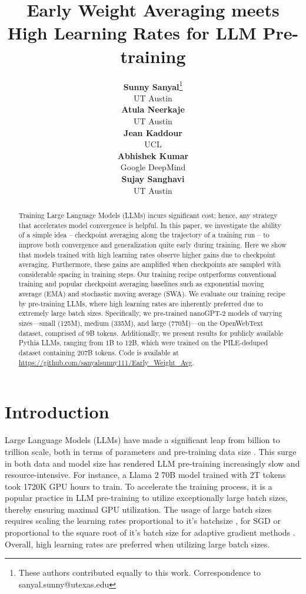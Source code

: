 \documentclass{article}
\title{Early Weight Averaging meets High Learning Rates for LLM Pre-training}
\author{%
  \textbf{Sunny Sanyal}\thanks{These authors contributed equally to this work. Correspondence to sanyal.sunny@utexas.edu} 
  \vspace{0.25em} \\
  UT Austin \\
  \And
  \textbf{Atula Neerkaje}\footnotemark[1]
  \vspace{0.25em} \\
  UT Austin \\
  \And
  \textbf{Jean Kaddour} 
  \vspace{0.25em} \\
  UCL \\
  \AND
  \textbf{Abhishek Kumar} 
  \vspace{0.25em} \\
  Google DeepMind \\
  \And
  \textbf{Sujay Sanghavi} 
  \vspace{0.25em} \\
  UT Austin \\
}
\begin{document}
\maketitle


\begin{abstract}
 Training Large Language Models (LLMs) incurs significant cost; hence, any strategy that accelerates model convergence is helpful. In this paper, we investigate the ability of a simple idea – checkpoint averaging along the trajectory of a training run – to improve both convergence and generalization quite early during training. Here we show that models trained with high learning rates observe higher gains due to checkpoint averaging. Furthermore, these gains are amplified when checkpoints are sampled with considerable spacing in training steps. Our training recipe outperforms conventional training and popular checkpoint averaging baselines such as exponential moving average (EMA) and stochastic moving average (SWA). We evaluate our training recipe by pre-training LLMs, where high learning rates are inherently preferred due to extremely large batch sizes. Specifically, we pre-trained nanoGPT-2 models of varying sizes—small (125M), medium (335M), and large (770M)—on the OpenWebText dataset, comprised of 9B tokens. Additionally, we present results for publicly available Pythia LLMs, ranging from 1B to 12B, which were trained on the PILE-deduped dataset containing 207B tokens. Code is available at \url{https://github.com/sanyalsunny111/Early_Weight_Avg}.
\end{abstract}


\section{Introduction} \label{sec:intro}

Large Language Models (LLMs) have made a significant leap from billion to trillion scale, both in terms of parameters \citep{chowdhery2022palm, ren2023pangu} and pre-training data size \citep{chinchilla} \cite{touvron2023llama, touvron2023llama2}. This surge in both data and model size has rendered LLM pre-training increasingly slow and resource-intensive. For instance, a Llama 2 70B model trained with 2T tokens took 1720K GPU hours to train. To accelerate the training process, it is a popular practice in LLM pre-training \citep{biderman2023pythia, touvron2023llama} to utilize exceptionally large batch sizes, thereby ensuring maximal GPU utilization. The usage of large batch sizes requires scaling the learning rates proportional to it's batchsize \citep{goyal2017accurate}, \citep{krizhevsky2014one} for SGD or proportional to the square root of it's batch size for adaptive gradient methods \citep{malladi2022sdes}. Overall, high learning rates are preferred when utilizing large batch sizes.
\end{document}
